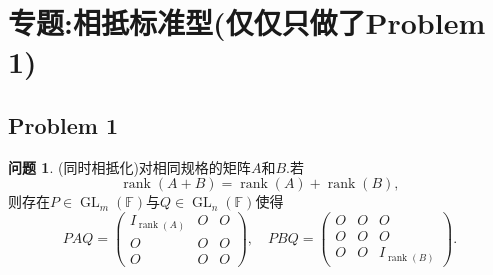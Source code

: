 \documentclass[11pt]{ctexart}
\theoremstyle{definition}
\newtheorem{qqq}{问题}[section]
\numberwithin{equation}{section}
\begin{document}
\section{专题:相抵标准型(仅仅只做了Problem 1)}
\subsection{Problem 1}
\begin{qqq}
    (同时相抵化)对相同规格的矩阵$A$和$B$.若$$\operatorname{rank}(A+B)=\operatorname{rank}(A)+\operatorname{rank}(B),$$则存在$P\in \operatorname{GL}_m(\mathbb{F})$与$Q\in \operatorname{GL}_n(\mathbb{F})$使得$$
    PAQ=\begin{pmatrix}
        I_{\operatorname{rank}(A)}&O&O\\O&O&O\\O&O&O
    \end{pmatrix},\quad PBQ=\begin{pmatrix}
        O&O&O\\O&O&O\\O&O&I_{\operatorname{rank}(B)}
    \end{pmatrix}.
    $$
\end{qqq}
\end{document}
